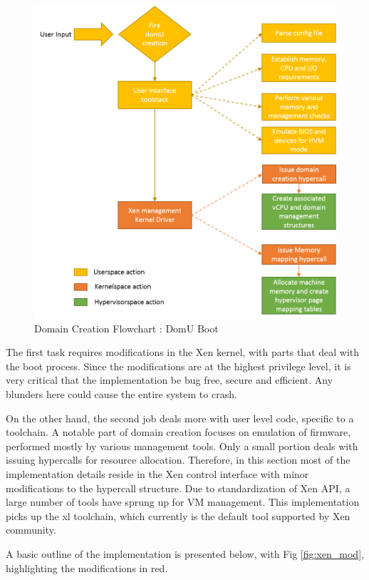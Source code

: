 \begin{figure}[H]
\centering
\includegraphics[scale=0.9]{figures/domain_creation2.png}
\caption{Domain Creation Flowchart : DomU Boot}
\label{fig:dom_flowchart}
\end{figure}
The first task requires modifications in the Xen kernel, with parts that deal with the boot process. Since the modifications are at the highest privilege level, it is very critical that the implementation be bug free, secure and efficient. Any blunders here could cause the entire system to crash.

On the other hand, the second job deals more with user level code, specific to a toolchain. A notable part of domain creation focuses on emulation of firmware, performed mostly by various management tools. Only a small portion deals with issuing hypercalls for resource allocation. Therefore, in this section most of the implementation details reside in the Xen control interface with minor modifications to the hypercall structure. Due to standardization of Xen API, a large number of tools have sprung up for VM management. This implementation picks up the xl toolchain, which currently is the default tool supported by Xen community.

A basic outline of the implementation is presented below, with Fig \ref{fig:xen_mod}, highlighting the modifications in red.

